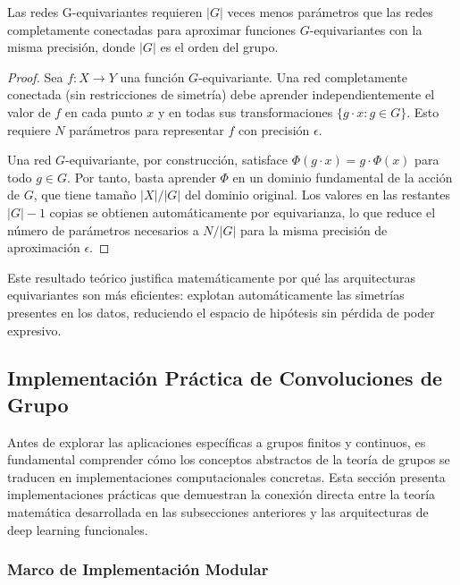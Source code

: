 \begin{corollary}\label{corollary:parametric_efficiency}
    Las redes G-equivariantes requieren $|G|$ veces menos parámetros que las redes completamente conectadas para aproximar funciones $G$-equivariantes con la misma precisión, donde $|G|$ es el orden del grupo.
\end{corollary}

\begin{proof}
Sea $f: X \to Y$ una función $G$-equivariante. Una red completamente conectada (sin restricciones de simetría) debe aprender independientemente el valor de $f$ en cada punto $x$ y en todas sus transformaciones $\{g \cdot x : g \in G\}$. Esto requiere $N$ parámetros para representar $f$ con precisión $\epsilon$.

Una red $G$-equivariante, por construcción, satisface $\Phi(g \cdot x) = g \cdot \Phi(x)$ para todo $g \in G$. Por tanto, basta aprender $\Phi$ en un dominio fundamental de la acción de $G$, que tiene tamaño $|X|/|G|$ del dominio original. Los valores en las restantes $|G| - 1$ copias se obtienen automáticamente por equivarianza, lo que reduce el número de parámetros necesarios a $N/|G|$ para la misma precisión de aproximación $\epsilon$.
\end{proof}

Este resultado teórico justifica matemáticamente por qué las arquitecturas equivariantes son más eficientes: explotan automáticamente las simetrías presentes en los datos, reduciendo el espacio de hipótesis sin pérdida de poder expresivo.

\subsection{Implementación Práctica de Convoluciones de Grupo}\label{subsec:implementacion_practica_gcnn}

Antes de explorar las aplicaciones específicas a grupos finitos y continuos, es fundamental comprender cómo los conceptos abstractos de la teoría de grupos se traducen en implementaciones computacionales concretas. Esta sección presenta implementaciones prácticas que demuestran la conexión directa entre la teoría matemática desarrollada en las subsecciones anteriores y las arquitecturas de deep learning funcionales.

\subsubsection{Marco de Implementación Modular}\label{subsubsec:marco_implementacion_modular}

